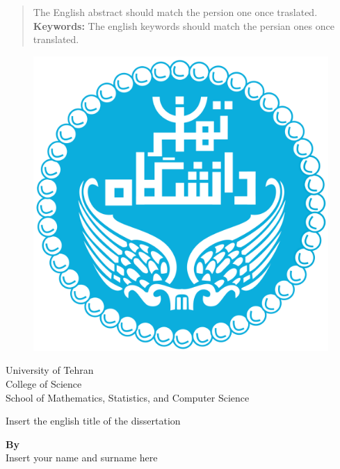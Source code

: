 \documentclass[12pt]{report}
\begin{document}
\begin{latin}
\begin{abstract}
The English abstract should match the persion one once traslated.\\[0.5cm]
\textbf{Keywords: } The english keywords should match the persian ones once translated. 
\end{abstract}
\newpage

\begin{figure}
\centering
\includegraphics[scale=0.1]{UT-Logo.png}
\end{figure}
\begin{center}
University of Tehran\\
College of Science\\
School of Mathematics, Statistics, and Computer Science
\end{center}

\vfill

\begin{center}
\LARGE{Insert the english title of the dissertation}
\end{center}

\vfill

{\large \begin{center}
\textbf{
By\\
} Insert your name and surname here 
\end{center}

}
\end{latin}
\end{document}
